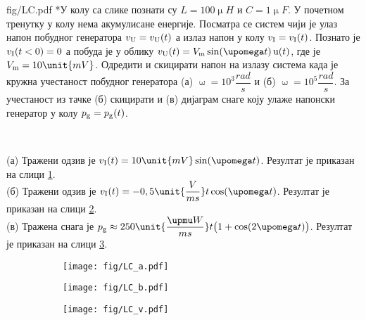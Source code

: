 \begin{slikaDesno}{fig/LC.pdf}
{\color{red}*}\PID  У колу са слике познати су 
$L = 100\unit{\upmu H}$ и $C = 1\unit{\upmu F}$.
У почетном тренутку у колу нема 
акумулисане енергије. Посматра
се систем чији је улаз напон побудног генератора $v_{\rm U} = v_{\rm U}(t)$ а излаз напон у колу 
$v_{\rm I} = v_{\rm I}(t)$. 
Познато је $v_{\rm I}(t < 0) = 0$ а побуда
је у облику $v_{\rm U}(t) = V_{\rm m} 
\sin(\upomega t)\,{\rm u}(t)$, где је 
$V_{\rm m} = 10\unit{mV}$. Одредити 
и скицирати напон на 
излазу система када је кружна учестаност 
побудног генератора (а) $\upomega = 10^3 
\unit{\dfrac{rad}{s}}$ и (б) 
$\upomega = 10^5 
\unit{\dfrac{rad}{s}}$. За учестаност из 
тачке (б) скицирати и (в) дијаграм снаге 
коју улаже напонски генератор у колу
$p_{\rm g} =p_{\rm g}(t)$.
\end{slikaDesno}\\

\REZULTAT 

(а) Тражени одзив је $v_{\rm I}(t) = 10\unit{mV} \sin(\upomega t)$. 
Резултат је приказан на слици \ref{fig:\ID.a}.\\[2mm]

(б) Тражени одзив је $v_{\rm I}(t) = -0,5\unit{\dfrac{V}{ms}} t \cos(\upomega t)$.
Резултат је приказан на слици \ref{fig:\ID.b}.\\[2mm]

(в) Тражена снага је $p_{\rm g} \approx 250\unit{\dfrac{\upmu W}{ms}} t
\bigl(1 + \cos(2\upomega t) \bigr)$.
Резултат је приказан на слици \ref{fig:\ID.v}. \\

\noindent
\begin{figure}[ht!]
    \hspace*{0pt}%
    \begin{subfigure}[b]{0.32\textwidth}
        \texttt{[image: fig/LC\_a.pdf]}
        \caption{}
        \label{fig:\ID.a}
    \end{subfigure}
    \begin{subfigure}[b]{0.32\textwidth}
        \texttt{[image: fig/LC\_b.pdf]}
        \caption{}
        \label{fig:\ID.b}
    \end{subfigure}
    \begin{subfigure}[b]{0.32\textwidth}
        \texttt{[image: fig/LC\_v.pdf]}
        \caption{}
        \label{fig:\ID.v}
    \end{subfigure}
    \caption{}
    \label{fig:\ID.2}
\end{figure}



